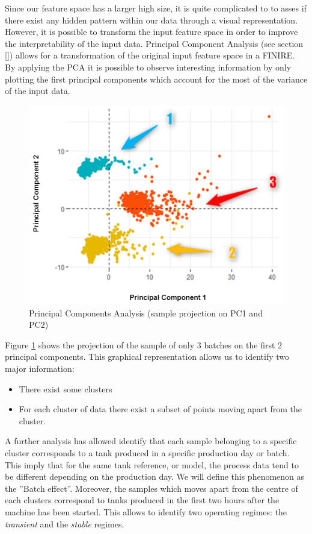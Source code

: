 Since our feature space has a larger high size, it is quite complicated to to asses if there exist any hidden pattern within our data through a visual representation. However, it is possible to transform the input feature space in order to improve the interpretability of the input data. Principal Component Analysis (see section \ref{}) allows for a transformation of the original input feature space in a FINIRE. By applying the PCA it is possible to observe interesting information by only plotting the first principal components which account for the most of the variance of the input data. 
%
\begin{figure}
\centerline{\includegraphics[scale=0.5]{images/chapter_3/PCA.png}}
\caption{Principal Components Analysis (sample projection on PC1 and PC2)}
\label{fig:pca}
\end{figure}
%
Figure \ref{fig:pca} shows the projection of the sample of only 3 batches on the first 2 principal components. This graphical representation allows us to identify two major information:
\begin{itemize}
    \item There exist some clusters
    \item For each cluster of data there exist a subset of points moving apart from the cluster.
\end{itemize}

A further analysis has allowed identify that each sample belonging to a specific cluster corresponds to a tank produced in a specific production day or batch. This imply that for the same tank reference, or model, the process data tend to be different depending on the production day. We will define this phenomenon as the ''Batch effect''. Moreover, the samples which moves apart from the centre of each clusters correspond to tanks produced in the first two hours after the machine has been started. This allows to identify two operating regimes: the \textit{transient} and the \textit{stable} regimes. 


